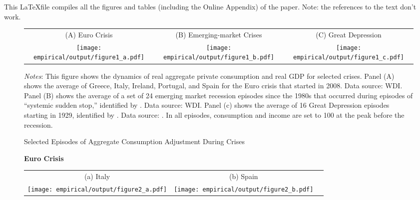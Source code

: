 \documentclass[12pt]{article}
\begin{document}

\flushleft
\justifying

This \LaTeX  file compiles all the figures and tables (including the Online Appendix) of the paper.  Note: the references to the text don't work.


\bigskip

\flushleft
\justifying

\begin{spacing}{1.5}

\begin{figure}[H] \centering
	\medskip
	\begin{tabular}{ccc}
		\small{(A) Euro Crisis} & \small{(B) Emerging-market Crises} & \small{(C) Great Depression} \\         
    \texttt{[image: empirical/output/figure1\_a.pdf]} 
& \texttt{[image: empirical/output/figure1\_b.pdf]} 
&  \texttt{[image: empirical/output/figure1\_c.pdf]} 
	\end{tabular}
		\caption{Selected Episodes of Aggregate Consumption Adjustment During Crises \label{fig_ss}}
	\medskip
	\begin{flushleft} \footnotesize \textit{Notes}: This figure shows the dynamics of real aggregate private consumption and real GDP for selected crises. Panel (A) shows the average of Greece, Italy, Ireland, Portugal, and Spain for the Euro crisis that started in 2008. Data source: WDI. Panel (B) shows the average of a set of 24 emerging market recession episodes since the 1980s that occurred during episodes of ``systemic sudden stop,'' identified by \cite{calvo2016macroeconomics}. Data source: WDI. Panel (c) shows the average of 16 Great Depression episodes starting in 1929, identified by \cite{barro2006rare}. Data source: \cite{barro2008consumption}. In all episodes, consumption and income are set to 100 at the peak before the recession.
	\end{flushleft}
\end{figure}

\begin{figure}[H]
{\bf Euro Crisis}\\\medskip
\begin{tabular}{ccc}
{\small{}{(a) Italy } } & {\small{}{(b) Spain} } \vspace{.5em} \\
\texttt{[image: empirical/output/figure2\_a.pdf]} &
\texttt{[image: empirical/output/figure2\_b.pdf]}
\end{tabular}\\


\end{figure}
\end{spacing}
\end{document}
